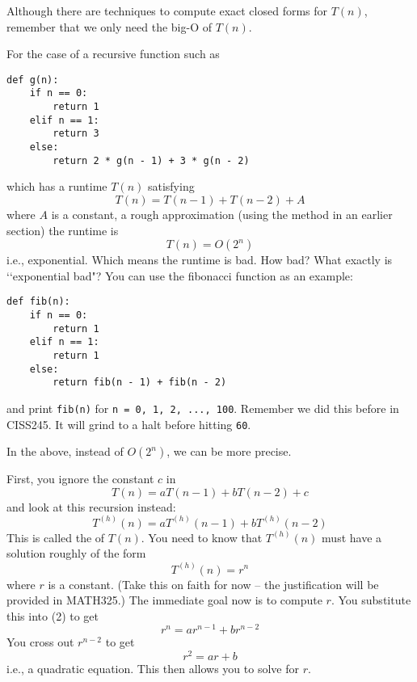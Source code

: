 Although there are techniques to compute exact closed forms for $T(n)$,
remember that we only need the big-O of $T(n)$.

For the case of a recursive function such as 
\begin{Verbatim}[frame=single,fontsize=\footnotesize]
def g(n):
    if n == 0: 
        return 1
    elif n == 1:
        return 3
    else:
        return 2 * g(n - 1) + 3 * g(n - 2)
\end{Verbatim}
which has a runtime $T(n)$ satisfying
\[
T(n) = T(n - 1) + T(n - 2) + A
\]
where $A$ is a constant, a rough approximation (using the method
in an earlier section) the runtime is
\[
T(n) = O(2^n)
\]
i.e., exponential.
Which means the runtime is bad.
How bad? What exactly is \lq\lq exponential bad"?
You can use the fibonacci function as an example:
\begin{Verbatim}[frame=single,fontsize=\footnotesize]
def fib(n):
    if n == 0: 
        return 1
    elif n == 1:
        return 1
    else:
        return fib(n - 1) + fib(n - 2)
\end{Verbatim}
and print \verb!fib(n)! for \verb!n = 0, 1, 2, ..., 100!.
Remember we did this before in CISS245.
It will grind to a halt before hitting \verb!60!.

In the above, instead of $O(2^n)$, we can be more precise.

First, you ignore the constant $c$ in
\[
T(n) = aT(n - 1) + bT(n - 2) + c \tag{1}
\]
and look at this recursion instead:
\[
T^{(h)}(n) = aT^{(h)}(n - 1) + bT^{(h)}(n - 2) \tag{2}
\]
This is called the  of $T(n)$.
You need to know that $T^{(h)}(n)$ must have a solution
roughly of the form
\[
T^{(h)}(n) = r^n
\]
where $r$ is a constant.
(Take this on faith for now -- the justification will be
provided in MATH325.)
The immediate goal now is to compute $r$.
You substitute this into (2) to get
\[
r^n = ar^{n-1} + br^{n-2}
\]
You cross out $r^{n - 2}$ to get
\[
r^2 = ar + b
\]
i.e., a quadratic equation.
This then allows you to solve for $r$.

